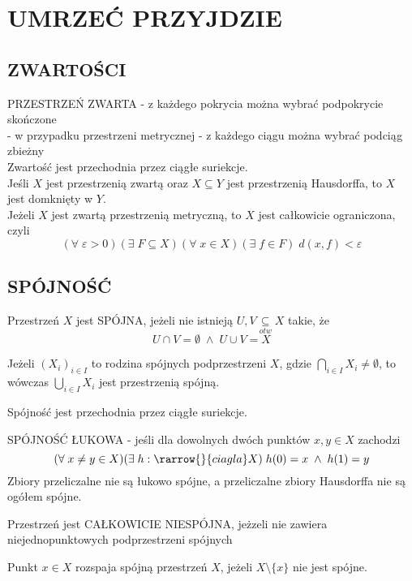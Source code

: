 \documentclass{article}
\begin{document}
    \section{UMRZEĆ PRZYJDZIE}
    \subsection{ZWARTOŚCI}
    {\large\color{def}PRZESTRZEŃ ZWARTA} - z każdego pokrycia można wybrać podpokrycie skończone\medskip\\
    \indent - w przypadku przestrzeni metrycznej - z każdego ciągu można wybrać podciąg zbieżny\bigskip\\
    Zwartość jest {\color{acc}przechodnia przez ciągłe suriekcje}.\bigskip\\
    Jeśli $X$ jest przestrzenią zwartą oraz $X\subseteq Y$ jest przestrzenią Hausdorffa, to $X$ jest domknięty w $Y$.\bigskip\\
    Jeżeli $X$ jest zwartą przestrzenią metryczną, to {\large\color{def}$X$ jest całkowicie ograniczona}, czyli
    $$(\forall\;\varepsilon>0)(\exists\;F\subseteq X)(\forall\;x\in X)(\exists\;f\in F)\;d(x, f)<\varepsilon$$

\subsection{SPÓJNOŚĆ}
    Przestrzeń $X$ jest {\large\color{def}SPÓJNA}, jeżeli nie istnieją $U, V\underset{otw}\subseteq X$ takie, że
    $$U\cap V=\emptyset\;\land\;U\cup V=X$$

    Jeżeli $(X_i)_{i\in I}$ to rodzina spójnych podprzestrzeni $X$, gdzie $\bigcap\limits_{i\in I}X_i\neq\emptyset$, to wówczas $\bigcup\limits_{i\in I}X_i$ jest przestrzenią spójną.\bigskip

    Spójność jest {\color{acc}przechodnia} przez ciągłe suriekcje.

    {\large\color{def}SPÓJNOŚĆ ŁUKOWA} - jeśli dla dowolnych dwóch punktów $x, y\in X$ zachodzi
    $$(\forall\;x\neq y\in X)(\exists\;h:\rarrow{}{ciagla}X)\;h(0)=x\;\land\;h(1)=y$$
    Zbiory przeliczalne nie są łukowo spójne, a przeliczalne zbiory Hausdorffa nie są ogółem spójne.\bigskip

    Przestrzeń jest {\large\color{def}CAŁKOWICIE NIESPÓJNA}, jeżzeli nie zawiera niejednopunktowych podprzestrzeni spójnych\bigskip

    Punkt $x\in X$ {\color{acc}rozspaja spójną przestrzeń $X$}, jeżeli $X\setminus\{x\}$ nie jest spójne. \bigskip
\end{document}
